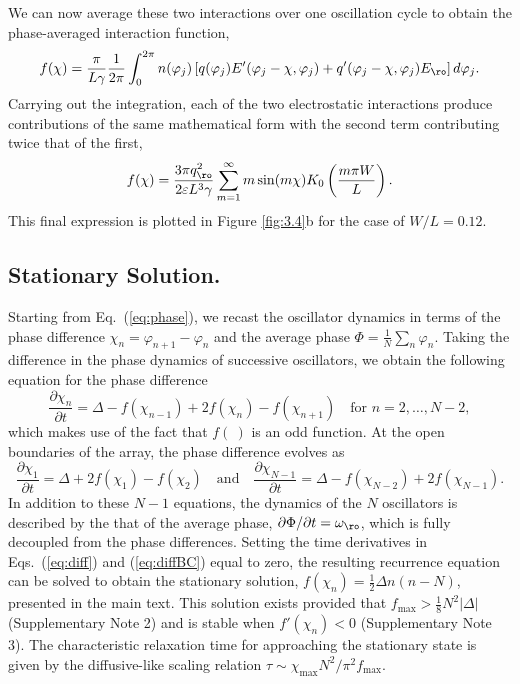 We can now average these two interactions over one oscillation cycle to obtain the phase-averaged interaction function,
\begin{equation}
    f(\chi) = \frac{\pi}{L\gamma}\frac{1}{2 \pi}\int_0^{2\pi} n(\varphi_j) \left[ q(\varphi_j) E'(\varphi_j-\chi,\varphi_j) + q'(\varphi_j-\chi,\varphi_j) E_{\ro} \right] d\varphi_j.
\end{equation}
Carrying out the integration, each of the two electrostatic interactions produce contributions of the same mathematical form with the second term contributing twice that of the first,
\begin{equation}
     f(\chi) = \frac{3\pi q_{\ro}^2}{2  \varepsilon L^3\gamma} \sum_{m=1}^{\infty} m \sin(m \chi)  K_0\left(\frac{m\pi W}{L}\right).
\end{equation}
This final expression is plotted in Figure \ref{fig:3.4}b for the case of $W/L=0.12$.


\subsection{Stationary Solution.} 
Starting from Eq.~(\ref{eq:phase}), we recast the oscillator dynamics in terms of the phase difference $\chi_n=\varphi_{n+1} - \varphi_n$ and the average phase $\Phi=\tfrac{1}{N}\sum_n\varphi_n$.  Taking the difference in the phase dynamics of successive oscillators, we obtain the following equation for the phase difference 
\begin{equation}
    \frac{\partial \chi_n}{\partial t} = \Delta - f(\chi_{n-1}) + 2 f(\chi_n) - f(\chi_{n+1})\quad\text{for }n=2,\dots,N-2, \label{eq:diff}
\end{equation}
which makes use of the fact that $f(~)$ is an odd function.  At the open boundaries of the array, the phase difference evolves as
\begin{equation}
    \frac{\partial \chi_1}{\partial t} = \Delta + 2f(\chi_1) - f(\chi_2)\quad\text{and}\quad\frac{\partial \chi_{N-1}}{\partial t} = \Delta - f(\chi_{N-2}) + 2f(\chi_{N-1}). \label{eq:diffBC}
\end{equation}
In addition to these $N-1$ equations, the dynamics of the $N$ oscillators is described by the that of the average phase, $\partial \Phi /\partial t = \omega_{\ro}$, which is fully decoupled from the phase differences. Setting the time derivatives in Eqs.~(\ref{eq:diff}) and (\ref{eq:diffBC}) equal to zero, the resulting recurrence equation can be solved to obtain the stationary solution, $f(\chi_n) = \tfrac{1}{2}\Delta n(n-N)$, presented in the main text. This solution exists provided that $f_{\max}>\tfrac{1}{8}N^2\lvert\Delta\rvert$ (Supplementary Note 2) and is stable when $f'(\chi_n)<0$ (Supplementary Note 3). The characteristic relaxation time for approaching the stationary state is given by the diffusive-like scaling relation $\tau\sim \chi_{\max}N^2/\pi^2 f_{\max}$.



